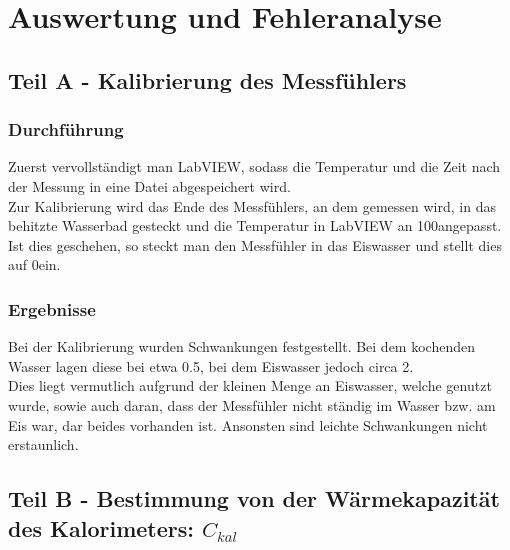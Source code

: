 \documentclass[11pt,a4paper]{article}
\begin{document}
\section{Auswertung und Fehleranalyse}

\subsection{Teil A - Kalibrierung des Messf\"uhlers}

\subsubsection{Durchf\"uhrung}
Zuerst vervollst\"andigt man LabVIEW, sodass die Temperatur und die Zeit nach der Messung in eine Datei abgespeichert wird.\\
Zur Kalibrierung wird das Ende des Messf\"uhlers, an dem gemessen wird, in das behitzte Wasserbad gesteckt und die Temperatur in LabVIEW an 100\celsius angepasst. Ist dies geschehen, so steckt man den Messf\"uhler in das Eiswasser und stellt dies auf 0\celsius ein.
\pagebreak
\subsubsection{Ergebnisse}
Bei der Kalibrierung wurden Schwankungen festgestellt. Bei dem kochenden Wasser lagen diese bei etwa 0.5\celsius, bei dem Eiswasser jedoch circa 2\celsius.\\
Dies liegt vermutlich aufgrund der kleinen Menge an Eiswasser, welche genutzt wurde, sowie auch daran, dass der Messf\"uhler nicht st\"andig im Wasser bzw. am Eis war, dar beides vorhanden ist. Ansonsten sind leichte Schwankungen nicht erstaunlich.

%

\subsection{Teil B - Bestimmung von der Wärmekapazität des Kalorimeters: $C_{kal}$}
\end{document}
